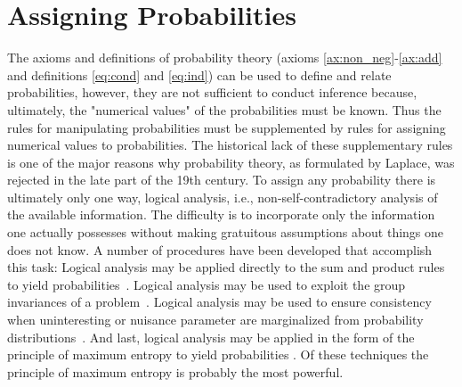 	
	\section{Assigning Probabilities}
	The axioms and definitions of probability theory (axioms \ref{ax:non_neg}-\ref{ax:add} and definitions \ref{eq:cond} and \ref{eq:ind}) can be used to define and relate probabilities, however, they are not sufficient to conduct inference because, ultimately, the "numerical values" of the probabilities must be known. Thus the rules for manipulating probabilities must be supplemented by rules for assigning numerical values to probabilities. The historical lack of these supplementary rules is one of the major reasons why probability theory, as formulated by Laplace, was rejected in the late part of the 19th century. To assign any probability there is ultimately only one way, logical analysis, i.e., non-self-contradictory analysis of the available information. The difficulty is to incorporate only the information one actually possesses without making gratuitous assumptions about things one does not know. A number of procedures have been developed that accomplish this task: Logical analysis may be applied directly to the sum and product rules to yield probabilities~\citep{jaynes_11}. Logical analysis may be used to exploit the group invariances of a problem~\citep{jaynes_16}. Logical analysis may be used to ensure consistency when uninteresting or nuisance parameter are marginalized from probability distributions~\citep{jaynes_21}. And last, logical analysis may be applied in the form of the principle of maximum entropy to yield probabilities \cite{zellner_bayesian_inference, jaynes_16,jaynes_19, shore_17,shore_18}. Of these techniques the principle of maximum entropy is probably the most powerful.
	
